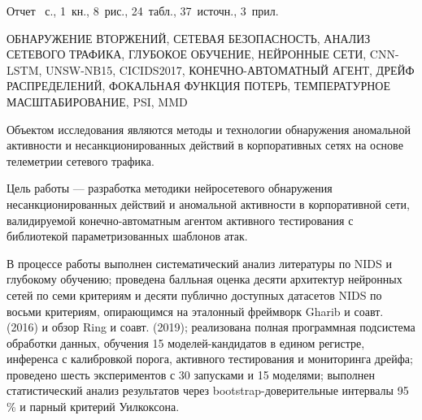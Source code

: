 
Отчет \pageref{lastpagebeforeappendix}~с., 1~кн., 8~рис., 24~табл.,
37~источн., 3~прил.

\medskip

\noindent
\begingroup
{}\sloppy
ОБНАРУЖЕНИЕ ВТОРЖЕНИЙ, СЕТЕВАЯ БЕЗОПАСНОСТЬ, АНАЛИЗ СЕТЕВОГО
ТРАФИКА, ГЛУБОКОЕ ОБУЧЕНИЕ, НЕЙРОННЫЕ СЕТИ, CNN-LSTM, UNSW-NB15,
CICIDS2017, КОНЕЧНО-АВТОМАТНЫЙ АГЕНТ, ДРЕЙФ РАСПРЕДЕЛЕНИЙ,
ФОКАЛЬНАЯ ФУНКЦИЯ ПОТЕРЬ, ТЕМПЕРАТУРНОЕ МАСШТАБИРОВАНИЕ, PSI, MMD
\par
\endgroup

\medskip

Объектом исследования являются методы и технологии обнаружения
аномальной активности и несанкционированных действий в корпоративных
сетях на основе телеметрии сетевого трафика.

Цель работы --- разработка методики нейросетевого обнаружения
несанкционированных действий и аномальной активности в
корпоративной сети, валидируемой конечно-автоматным агентом
активного тестирования с библиотекой параметризованных шаблонов
атак.

В процессе работы выполнен систематический анализ литературы по
NIDS и глубокому обучению; проведена балльная оценка десяти
архитектур нейронных сетей по семи критериям и десяти публично
доступных датасетов NIDS по восьми критериям, опирающимся на
эталонный фреймворк Gharib и соавт. (2016) и обзор Ring и соавт.
(2019); реализована полная программная подсистема обработки данных,
обучения 15 моделей-кандидатов в едином регистре, инференса с
калибровкой порога, активного тестирования и мониторинга дрейфа;
проведено шесть экспериментов с 30 запусками и 15 моделями;
выполнен статистический анализ результатов через bootstrap-доверительные
интервалы 95\,\% и парный критерий Уилкоксона.

